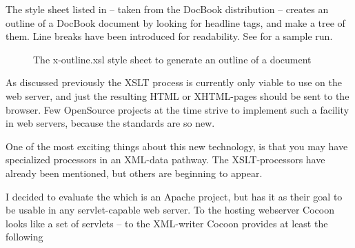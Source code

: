 % 



The style sheet listed in  -- taken from
the DocBook distribution -- creates an outline of a DocBook document
by looking for headline tags, and make a tree of them. Line breaks
have been introduced for readability.  See
 for a sample run.

\begin{figure}[tbp]
  \begin{center}
\small
{}    
    \caption{The x-outline.xsl style sheet to generate an outline of a document}
    \label{fig:listing-x-outline.xsl}
  \end{center}
\end{figure}

As discussed previously the XSLT process is currently only viable to
use on the web server, and just the resulting HTML or XHTML-pages
should be sent to the browser.  Few OpenSource projects at the time
strive to implement such a facility in web servers, because the
standards are so new.

One of the most exciting things about this new technology, is that you
may have specialized processors in an XML-data pathway.  The
XSLT-processors have already been mentioned, but others are beginning
to appear.

I decided to evaluate the
 which
is an Apache project, but has it as their goal to be usable in any
servlet-capable web server.  To the hosting webserver Cocoon looks
like a set of servlets -- to the XML-writer Cocoon provides at least
the following

